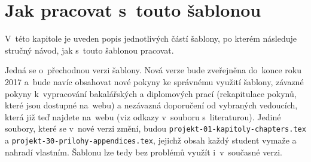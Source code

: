





\chapter{Jak pracovat s~touto šablonou}
\label{jak}

V~této kapitole je uveden popis jednotlivých částí šablony, po kterém následuje stručný návod, jak s~touto šablonou pracovat. 

Jedná se o~přechodnou verzi šablony. Nová verze bude zveřejněna do~konce roku 2017 a~bude navíc obsahovat nové pokyny ke správnému využití šablony, závazné pokyny k~vypracování bakalářských a diplomových prací (rekapitulace pokynů, které jsou dostupné na~webu) a nezávazná doporučení od vybraných vedoucích, která již teď najdete na~webu (viz odkazy v~souboru s~literaturou). Jediné soubory, které se v~nové verzi změní, budou \texttt{projekt-01-kapitoly-chapters.tex} a \texttt{projekt-30-prilohy-appendices.tex}, jejichž obsah každý student vymaže a nahradí vlastním. Šablonu lze tedy bez problémů využít i~v~současné verzi.

